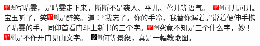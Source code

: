 {\includegraphics[width=3mm]{../Images/00002}\includegraphics[width=3mm]{../Images/00012}\footnotesize \kaishu 写晴雯，是晴雯走下来，断断不是袭人、平儿、莺儿等语气。　\includegraphics[width=3mm]{../Images/00002}\includegraphics[width=3mm]{../Images/00011}\footnotesize \kaishu 可儿可儿。}宝玉听了，笑{\includegraphics[width=3mm]{../Images/00002}\includegraphics[width=3mm]{../Images/00011}\footnotesize \kaishu 是醉笑。}道：``我忘了。你的手冷，我替你渥着。''说着便伸手携了晴雯的手，同仰首看门斗上新书的三个字。{{\includegraphics[width=3mm]{../Images/00002}\includegraphics[width=3mm]{../Images/00011}\footnotesize \kaishu 究竟不知是三个什么字，妙！　\includegraphics[width=3mm]{../Images/00002}\includegraphics[width=3mm]{../Images/00010}\footnotesize \kaishu 是不作开门见山文字。　}\includegraphics[width=3mm]{../Images/00006}\includegraphics[width=3mm]{../Images/00011}\footnotesize \kaishu 何等景象，真是一幅教歌图。}

